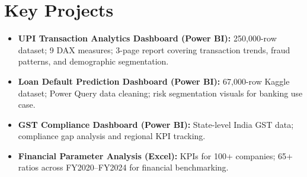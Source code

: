\documentclass[9pt, letterpaper]{article}
\newcommand{\resumeItem}[1]{\item\small{#1}}
\begin{document}
\section{Key Projects}

\begin{itemize}
  \resumeItem{\textbf{UPI Transaction Analytics Dashboard (Power BI):} 250,000-row dataset; 9 DAX measures; 3-page report covering transaction trends, fraud patterns, and demographic segmentation.}
  \resumeItem{\textbf{Loan Default Prediction Dashboard (Power BI):} 67,000-row Kaggle dataset; Power Query data cleaning; risk segmentation visuals for banking use case.}
  \resumeItem{\textbf{GST Compliance Dashboard (Power BI):} State-level India GST data; compliance gap analysis and regional KPI tracking.}
  \resumeItem{\textbf{Financial Parameter Analysis (Excel):} KPIs for 100+ companies; 65+ ratios across FY2020–FY2024 for financial benchmarking.}
\end{itemize}
\end{document}
